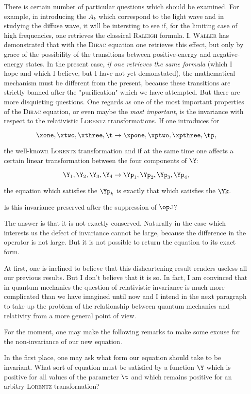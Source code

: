 \documentclass{article}
\newcommand{\uequ}[1]{
\begin{equation*}
#1
\end{equation*}
}
\newcommand{\var}[1]{#1}
\renewcommand{\it}[1]{\textit{#1}}
\renewcommand{\sc}[1]{\textsc{#1}}
\newcommand{\YX}[1]{\Y_{#1}}
\newcommand{\YpX}[1]{\Yp_{#1}}
\newcommand{\Ai}[1]{\var{A}_{#1}}
\newcommand{\Ak}{\Ai{k}}
\begin{document}
There is certain number of particular questions which should be examined. For example, in introducing the $\Ak$ which correspond to the light wave and in studying the diffuse wave, it will be intersting to see if, for the limiting case of high frequencies, one retrieves the classical \sc{Raleigh} formula. \sc{I. Waller} has demonstrated that with the \sc{Dirac} equation one retrieves this effect, but only by grace of the possibility of the transitions between positive-energy and negative-energy states. In the present case, \it{if one retrieves the same formula} (which I hope and which I believe, but I have not yet demonstated), the mathematical mechanism must be different from the present, because these transitions are strictly banned after the "purification" which we have attempted.
But there are more disquieting questions. One regards as one of the most important properties of the \sc{Dirac} equation, or even maybe the \it{most important}, is the invariance with respect to the relativistic \sc{Lorentz} transformations. If one introduces for
\uequ{
\xone, \xtwo, \xthree, \t \rightarrow \xpone, \xptwo, \xpthree, \tp,
}
the well-known \sc{Lorentz} transformation and if at the same time one affects a certain linear transformation between the four components of $\Y$:
\uequ{
\YX{1},\YX{2},\YX{3},\YX{4} \rightarrow \YpX{1},\YpX{2},\YpX{3},\YpX{4},
}
the equation which satisfies the $\YpX{k}$ is exactly that which satisfies the $\Yk$.

Is this invariance preserved after the suppression of $\opJ$?

The answer is that it is not exactly conserved. Naturally in the case which interests us the defect of invariance cannot be large, because the difference in the operator is not large. But it is not possible to return the equation to its exact form.

At first, one is inclined to believe that this disheartening result renders useless all our previous results. But I don't believe that it is so. In fact, I am convinced that in quantum mechanics the question of relativistic invariance is much more complicated than we have imagined until now and I intend in the next paragraph to take up the problem of the relationship between quantum mechanics and relativity from a more general point of view.

For the moment, one may make the following remarks to make some excuse for the non-invariance of our new equation.

In the first place, one may ask what form our equation should take to be invariant. What sort of equation must be satisfied by a function $\Y$ which is positive for all values of the parameter $\t$ and which remains positive for an arbitry \sc{Lorentz} transfornation?
\end{document}

